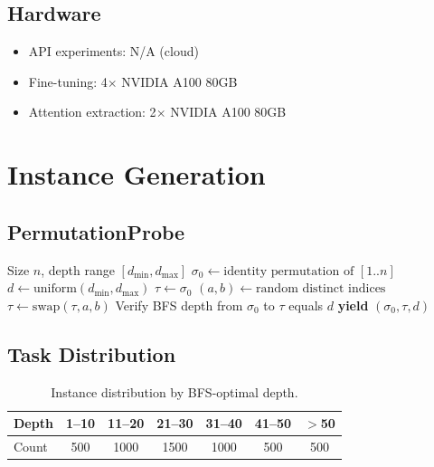 \documentclass{article}
\theoremstyle{plain}
\theoremstyle{definition}
\theoremstyle{remark}
\begin{document}
\subsection{Hardware}
\begin{itemize}
\item API experiments: N/A (cloud)
\item Fine-tuning: 4$\times$ NVIDIA A100 80GB
\item Attention extraction: 2$\times$ NVIDIA A100 80GB
\end{itemize}


\section{Instance Generation}
\label{app:instances}

\subsection{PermutationProbe}

\begin{algorithm}[h]
\caption{PermutationProbe Instance Generation}
\begin{algorithmic}[1]
\REQUIRE Size $n$, depth range $[d_{\min}, d_{\max}]$
    \STATE $\sigma_0 \leftarrow \text{identity permutation of } [1..n]$
    \STATE $d \leftarrow \text{uniform}(d_{\min}, d_{\max})$
    \STATE $\tau \leftarrow \sigma_0$
        \STATE $(a, b) \leftarrow \text{random distinct indices}$
        \STATE $\tau \leftarrow \text{swap}(\tau, a, b)$
    \ENDFOR
    \STATE Verify BFS depth from $\sigma_0$ to $\tau$ equals $d$
    \STATE \textbf{yield} $(\sigma_0, \tau, d)$
\ENDFOR
\end{algorithmic}
\end{algorithm}

\subsection{Task Distribution}

\begin{table}[h]
\centering
\caption{Instance distribution by BFS-optimal depth.}
\label{tab:instances}
\small
\begin{tabular}{@{}lcccccc@{}}
\toprule
\textbf{Depth} & 1--10 & 11--20 & 21--30 & 31--40 & 41--50 & $>$50 \\
\midrule
Count & 500 & 1000 & 1500 & 1000 & 500 & 500 \\
\bottomrule
\end{tabular}
\end{table}
\end{document}
